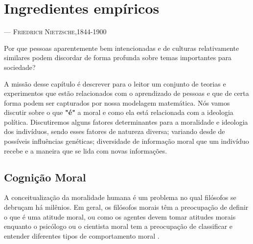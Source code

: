 \chapter{Ingredientes empíricos} %
\label{chap:mft}
\begin{epigraphs}
{\---- \textsc{Friedrich Nietzsche,1844-1900}}
\end{epigraphs}

Por que pessoas aparentemente bem intencionadas e de culturas relativamente
similares podem discordar de forma profunda sobre temas importantes para
sociedade?  

A missão desse capítulo é descrever para o leitor um conjunto de teorias
e experimentos que estão relacionados com o aprendizado de pessoas e que
de certa forma podem ser capturados por nossa modelagem matemática. Nós
vamos discutir sobre o que \textbf{"é"} a moral e como ela está relacionada
com a ideologia política. Discutiremos alguns fatores determinantes para
a moralidade e ideologia dos indivíduos, sendo esses fatores de natureza
diversa; variando desde de possíveis influências genéticas; diversidade
de informação moral que um indivíduo recebe e a maneira que se lida
com novas informações.

\newpage
\section{Cognição Moral} %

A conceitualização da moralidade humana é um problema no qual
filósofos se debruçam há milênios. Em geral, os filósofos morais têm
a preocupação de definir o que é uma atitude moral, ou como os agentes
devem tomar atitudes morais enquanto o psicólogo ou o cientista moral tem
a preocupação de classificar e entender diferentes tipos de comportamento
moral \citep{Greene2003a,Casebeer2003}.

